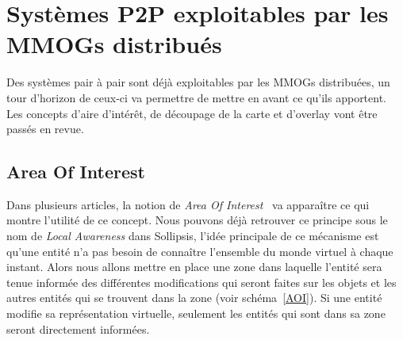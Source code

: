 \section{Systèmes P2P exploitables par les MMOGs distribués}
	Des systèmes pair à pair sont déjà exploitables par les MMOGs distribuées, un tour d'horizon de ceux-ci va permettre de mettre en avant ce qu'ils apportent. Les concepts d'aire d'intérêt, de découpage de la carte et d'overlay vont être passés en revue.
	\subsection{Area Of Interest}
	Dans plusieurs articles, la notion de \textit{Area Of Interest}~\cite{1403002,1267692,1015507} va apparaître ce qui montre l'utilité de ce concept. Nous pouvons déjà retrouver ce principe sous le nom de \textit{Local Awareness} dans Sollipsis, l'idée principale de ce mécanisme est qu'une entité n'a pas besoin de connaître l'ensemble du monde virtuel à chaque instant. Alors nous allons mettre en place une zone dans laquelle l'entité sera tenue informée des différentes modifications qui seront faites sur les objets et les autres entités qui se trouvent dans la zone (voir schéma~\ref{AOI}). Si une entité modifie sa représentation virtuelle, seulement les entités qui sont dans sa zone seront directement informées.\\


